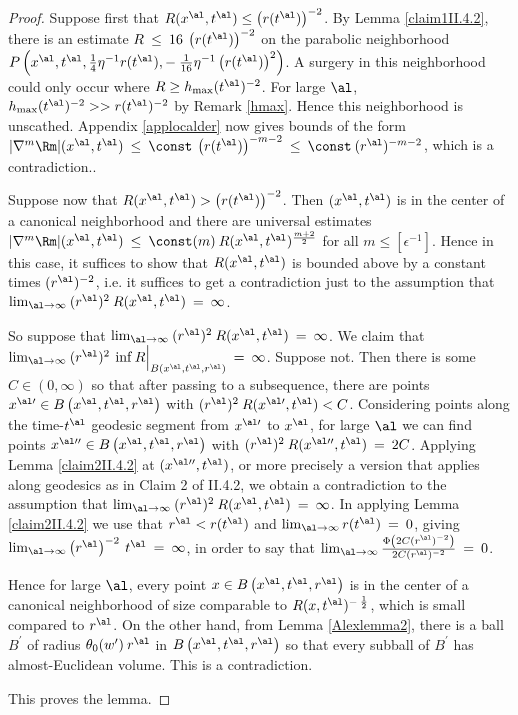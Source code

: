 \begin{proof}
Suppose first that
$R(x^\al, t^\al) \le \left( r(t^\al) \right)^{-2}$.
By Lemma \ref{claim1II.4.2}, there is an estimate
$R \: \le \: 16 \: \left( r(t^\al) \right)^{-2}$ on the parabolic neighborhood
$P \left( x^\al, t^\al, \frac14 \eta^{-1} r(t^\al),
- \: \frac{1}{16} \eta^{-1} \left( r(t^\al) \right)^2 \right)$.
A surgery in this neighborhood could only occur where
$R \ge h_{\max}(t^\al)^{-2}$. For large $\al$,
$h_{\max}(t^\al)^{-2} >> r(t^\al)^{-2}$ by Remark \ref{hmax}.
Hence this neighborhood is unscathed.
Appendix \ref{applocalder} now gives bounds of the form
$|\nabla^m \Rm|(x^\al, t^\al) \: \le \: \const \:
\left( r(t^\al) \right)^{-m-2} \: \le \: \const \:
(r^\al)^{-m-2}$, which is a contradiction..

Suppose now that $R(x^\al, t^\al) > \left( r(t^\al) \right)^{-2}$.
Then $(x^\al, t^\al)$ is in the center of a canonical neighborhood and there
are universal estimates $|\nabla^m \Rm|(x^\al, t^\al) \: \le \: \const(m) \:
R(x^\al, t^\al)^{\frac{m+2}{2}}$ for all $m \le [\epsilon^{-1}]$. Hence
in this case, it suffices to show that $R(x^\al, t^\al)$ is bounded above by
a constant times $(r^\al)^{-2}$, i.e. it suffices to get a contradiction
just to the assumption that
$\lim_{\al \rightarrow \infty} \:
(r^\al)^{2} \: R(x^\al, t^\al) \: = \: \infty$.

So suppose that $\lim_{\al \rightarrow \infty} \:
(r^\al)^{2} \: R(x^\al, t^\al) \: = \: \infty$.
We claim that $\lim_{\al \rightarrow \infty} \:
(r^\al)^{2} \: \inf R \Big|_{B \left( x^\al, t^\al,
r^\al \right)} \: = \: \infty$.
Suppose not.  Then there is some $C \in (0, \infty)$ so that
after passing to a subsequence, there are points
$x^{\al \prime} \in B \left( x^\al, t^\al, r^\al
 \right)$ with
$(r^\al)^{2} \: R(x^{\al \prime}, t^\al) < C$. Considering points
along the time-$t^\al$ geodesic segment from
$x^{\al \prime}$ to $x^\al$,
for large $\al$ we can find points
$x^{\al \prime \prime} \in B \left( x^\al, t^\al,
r^\al \right)$ with
$(r^\al)^{2} \: R(x^{\al \prime\prime}, t^\al) \: = \: 2C$.
Applying Lemma \ref{claim2II.4.2} at $(x^{\al \prime \prime}, t^\al)$,
or more precisely a version that applies along geodesics as in
Claim 2 of II.4.2, we obtain a contradiction to the assumption
that $\lim_{\al \rightarrow \infty} \:
(r^\al)^{2} \: R(x^\al, t^\al) \: = \: \infty$. In applying
Lemma \ref{claim2II.4.2} we use that
$r^\al < r(t^\al)$ and $\lim_{\al \rightarrow \infty} r(t^\al) \: = \: 0$,
giving
$\lim_{\al \rightarrow \infty} \left( r^\al \right)^{-2} \: t^\al \: = \:
\infty$, in order to say that
$\lim_{\al \rightarrow \infty}
\frac{\Phi \left( 2C (r^\al)^{-2} \right)}{ 2C (r^\al)^{-2}} \: = \: 0$.

Hence for large $\al$, every point $x \in B \left( x^\al, t^\al,
r^\al \right)$ is in the
center of a canonical neighborhood of size comparable to
$R(x, t^\al)^{- \: \frac12}$, which is small compared to $r^\al$.
On the other hand,
from Lemma \ref{Alexlemma2},
there is a ball $B^\prime$ of radius $\theta_0(w^{\prime}) \:
r^\al$ in
$B \left( x^\al, t^\al, r^\al \right)$ so that every subball of $B^\prime$ has
almost-Euclidean volume. This is a contradiction.

This proves the lemma.
\end{proof}

